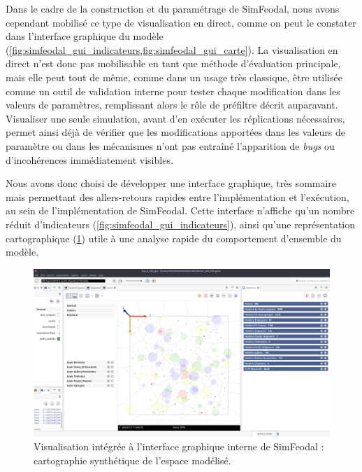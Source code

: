 Dans le cadre de la construction et du paramétrage de SimFeodal, nous avons cependant mobilisé ce type de visualisation en direct, comme on peut le constater dans l'interface graphique du modèle (\cref{fig:simfeodal_gui_indicateurs,fig:simfeodal_gui_carte}).
La visualisation en direct n'est donc pas mobilisable en tant que méthode d'évaluation principale, mais elle peut tout de même, comme dans un usage très classique, être utilisée comme un outil de validation interne pour tester chaque modification dans les valeurs de paramètres, remplissant alors le rôle de \og préfiltre\fg{} décrit auparavant.
Visualiser une seule simulation, avant d'en exécuter les réplications nécessaires, permet ainsi déjà de vérifier que les modifications apportées dans les valeurs de paramètre ou dans les mécanismes n'ont pas entraîné l'apparition de \textit{bugs} ou d'incohérences immédiatement visibles.

Nous avons donc choisi de développer une interface graphique, très sommaire mais permettant des allers-retours rapides entre l'implémentation et l'exécution, au sein de l'implémentation de SimFeodal.
Cette interface n'affiche qu'un nombre réduit d'indicateurs (\cref{fig:simfeodal_gui_indicateurs}), ainsi qu'une représentation cartographique (\cref{fig:simfeodal_gui_carte}) utile à une analyse rapide du comportement d'ensemble du modèle.

\begin{figure}[H]
	\captionsetup{width=\linewidth}
	\includegraphics[width=\linewidth]{img/SimFeodal_GUI_carte.png}
	\caption[Visualisation intégrée à l'interface graphique interne de SimFeodal.]{Visualisation intégrée à l'interface graphique interne de SimFeodal : cartographie synthétique de l'espace modélisé.}
	\label{fig:simfeodal_gui_carte}
\end{figure}

